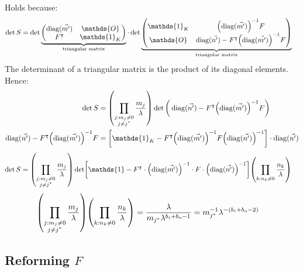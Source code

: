 \documentclass[
	english,
	a4paper,
	fontsize=10pt,
	parskip=half,
	titlepage=true,
	DIV=12,
	final
]{scrreprt}
\newcommand*{\transp}{\ensuremath{^\intercal}}
\DeclareMathOperator{\diag}{diag}
\begin{document}
Holds because:
\begin{align}
	\det S
&=
	\det\underbrace{
		\begin{pmatrix}
			\diag(\vec{m'})	& \mathds{O}			\\
			F\transp			    & \mathds{1}_{K}
		\end{pmatrix}
	}_{\text{triangular matrix}}
	\cdot 
	\det\underbrace{
		\begin{pmatrix}
			\mathds{1}_K		&	\qty(\diag(\vec{m'}))^{-1} F		\\
			\mathds{O}			&	\diag(\vec{n'}) - F\transp \qty(\diag(\vec{m'}))^{-1} F
		\end{pmatrix}
	}_{\text{triangular matrix}}
\end{align}
The determinant of a triangular matrix is the product of its diagonal elements. Hence:
\begin{align}
	\det S
&=
	\qty( \prod_{\substack{j : m_j \neq 0 \\ j \neq j^*}} \frac{m_j}{\lambda} )
	\det \qty(\Big. \diag(\vec{n'}) - F\transp \qty(\diag(\vec{m'}))^{-1} F)
\\
	\diag(\vec{n'}) - F\transp \qty(\diag(\vec{m'}))^{-1} F
&=
	\qty[
		\mathds{1}_K
		-
		F\transp \qty(\diag(\vec{m'}))^{-1} F \qty(\diag(\vec{n'}))^{-1}
	]
	\cdot
	\diag(\vec{n'})
\end{align}
\begin{align}
	\det S
&=
	\qty( \prod_{\substack{j : m_j \neq 0 \\ j \neq j^*}} \frac{m_j}{\lambda} )
	\det[
		\mathds{1} -
		F\transp \cdot 
		\qty( \diag(\vec{m'}) )^{-1} \cdot
		F \cdot \qty( \diag(\vec{n'}) )^{-1}
	]
	\qty( \prod_{          k : n_k \neq 0               } \frac{n_k}{\lambda} )
	\label{eqn:detSPenultimate}
\end{align}
\begin{align}
	\qty( \prod_{\substack{j : m_j \neq 0 \\ j \neq j^*}} \frac{m_j}{\lambda} )
	\qty( \prod_{          k : n_k \neq 0               } \frac{n_k}{\lambda} )
&=
	\frac{\lambda}{m_{j^*} \lambda^{b_i + b_o - 1}}
=
	m_{j^*}^{-1} \lambda^{-(b_i + b_o - 2)}
	\label{eqn:detSPrefactor}
\end{align}

\subsection{Reforming $F$}
\end{document}
